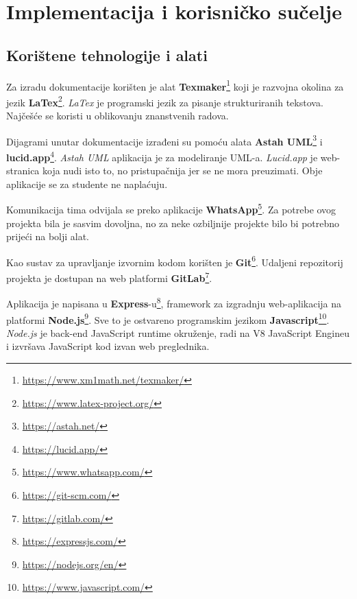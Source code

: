 \chapter{Implementacija i korisničko sučelje}
		
		
		\section{Korištene tehnologije i alati}
		
			
			Za izradu dokumentacije korišten je alat \textbf{Texmaker}\footnote{\url{https://www.xm1math.net/texmaker/}} koji je razvojna okolina za jezik \textbf{LaTex}\footnote{\url{https://www.latex-project.org/}}. \textit{LaTex} je programski jezik za pisanje strukturiranih tekstova. Najčešće se koristi u oblikovanju znanstvenih radova.
			
			Dijagrami unutar dokumentacije izrađeni su pomoću alata \textbf{Astah UML}\footnote{\url{https://astah.net/}} i \textbf{lucid.app}\footnote{\url{https://lucid.app/}}. \textit{Astah UML} aplikacija je za modeliranje UML-a. \textit{Lucid.app} je web-stranica koja nudi isto to, no pristupačnija jer se ne mora preuzimati. Obje aplikacije se za studente ne naplaćuju.
			
			Komunikacija tima odvijala se preko aplikacije \textbf{WhatsApp}\footnote{\url{https://www.whatsapp.com/}}. Za potrebe ovog projekta bila je sasvim dovoljna, no za neke ozbiljnije projekte bilo bi potrebno prijeći na bolji alat.
			
			Kao sustav za upravljanje izvornim kodom korišten je \textbf{Git}\footnote{\url{https://git-scm.com/}}. Udaljeni repozitorij projekta je dostupan na web platformi \textbf{GitLab}\footnote{\url{https://gitlab.com/}}.
			
			Aplikacija je napisana u \textbf{Express}-u\footnote{\url{https://expressjs.com/}}, framework za izgradnju web-aplikacija na platformi \textbf{Node.js}\footnote{\url{https://nodejs.org/en/}}. Sve to je ostvareno programskim jezikom \textbf{Javascript}\footnote{\url{https://www.javascript.com/}}. \textit{Node.js} je back-end JavaScript runtime okruženje, radi na V8 JavaScript Engineu i izvršava JavaScript kod izvan web preglednika. 
			
